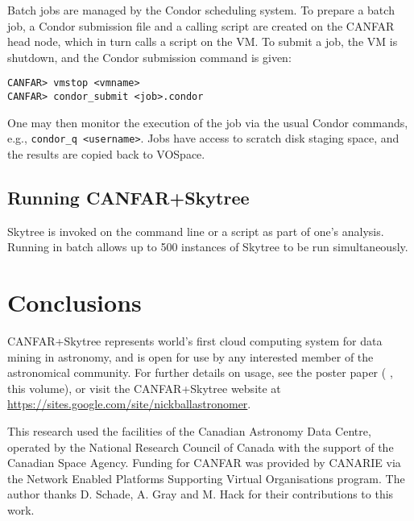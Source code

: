 Batch jobs are managed by the Condor scheduling system. To prepare a batch job, a Condor submission file and a calling script are created on the CANFAR head node, which in turn calls a script on the VM. To submit a job, the VM is shutdown, and the Condor submission command is given:

\begin{verbatim}
CANFAR> vmstop <vmname>
CANFAR> condor_submit <job>.condor
\end{verbatim}

One may then monitor the execution of the job via the usual Condor commands, e.g., {\tt condor\_q <username>}. Jobs have access to scratch disk staging space, and the results are copied back to VOSpace.

\subsection{Running CANFAR+Skytree}

Skytree is invoked on the command line or a script as part of one's analysis. Running in batch allows up to 500 instances of Skytree to be run simultaneously.

\section{Conclusions}

CANFAR+Skytree represents world's first cloud computing system for data mining in astronomy, and is open for use by any interested member of the astronomical community. For further details on usage, see the poster paper (\citeauthor{ball:adass12poster} \citeyear{ball:adass12poster}, this volume), or visit the CANFAR+Skytree website at \url{https://sites.google.com/site/nickballastronomer}.

\acknowledgements This research used the facilities of the Canadian Astronomy Data Centre, operated by the National Research Council of Canada with the support of the Canadian Space Agency. Funding for CANFAR was provided by CANARIE via the Network Enabled Platforms Supporting Virtual Organisations program. The author thanks D. Schade, A. Gray and M. Hack for their contributions to this work.


